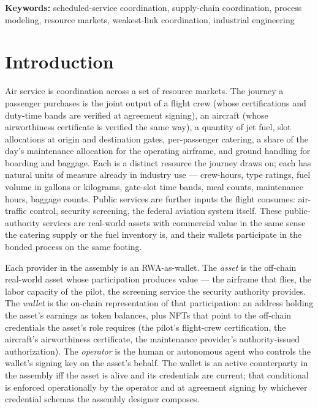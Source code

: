 \documentclass[11pt,a4paper]{article}
\theoremstyle{definition}
\theoremstyle{remark}
\begin{document}
\medskip
\noindent\textbf{Keywords:}
scheduled-service coordination, supply-chain coordination,
process modeling, resource markets, weakest-link coordination,
industrial engineering

\section{Introduction}
\label{sec:intro}

Air service is coordination across a set of resource markets.
The journey a passenger purchases is the joint output of a
flight crew (whose certifications and duty-time bands are
verified at agreement signing), an aircraft (whose airworthiness
certificate is verified the same way), a quantity of jet fuel,
slot allocations at origin and destination gates, per-passenger
catering, a share of the day's maintenance allocation for the
operating airframe, and ground handling for boarding and
baggage. Each is a distinct resource the journey draws on; each
has natural units of measure already in industry use --- crew-hours,
type ratings, fuel volume in gallons or kilograms, gate-slot time
bands, meal counts, maintenance hours, baggage counts. Public
services are further inputs the flight consumes: air-traffic
control, security screening, the federal aviation system itself.
These public-authority services are real-world assets with
commercial value in the same sense the catering supply or the
fuel inventory is, and their wallets participate in the bonded
process on the same footing.

Each provider in the assembly is an RWA-as-wallet. The
\emph{asset} is the off-chain real-world asset whose
participation produces value --- the airframe that flies, the
labor capacity of the pilot, the screening service the security
authority provides. The \emph{wallet} is the on-chain
representation of that participation: an address holding the
asset's earnings as token balances, plus NFTs that point to the
off-chain credentials the asset's role requires (the pilot's
flight-crew certification, the aircraft's airworthiness
certificate, the maintenance provider's authority-issued
authorization). The \emph{operator} is the human or autonomous
agent who controls the wallet's signing key on the asset's
behalf. The wallet is an active counterparty in the assembly iff
the asset is alive and its credentials are current; that
conditional is enforced operationally by the operator and at
agreement signing by whichever credential schemas the assembly
designer composes.
\end{document}
